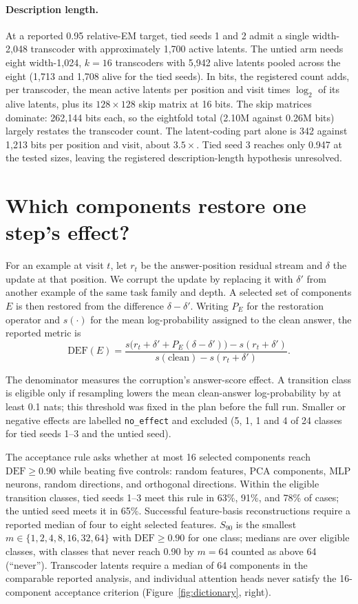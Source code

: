 \documentclass[10pt,letterpaper]{article}
\newcommand{\DEF}{\mathrm{DEF}}
\begin{document}
\paragraph{Description length.} At a reported 0.95 relative-EM target, tied seeds 1 and 2 admit a single width-2,048 transcoder with approximately 1,700 active latents. The untied arm needs eight width-1{,}024, $k{=}16$ transcoders with 5{,}942 alive latents pooled across the eight (1{,}713 and 1{,}708 alive for the tied seeds). In bits, the registered count adds, per transcoder, the mean active latents per position and visit times $\log_2$ of its alive latents, plus its $128\times128$ skip matrix at 16 bits. The skip matrices dominate: 262{,}144 bits each, so the eightfold total (2.10M against 0.26M bits) largely restates the transcoder count. The latent-coding part alone is 342 against 1{,}213 bits per position and visit, about $3.5\times$. Tied seed 3 reaches only 0.947 at the tested sizes, leaving the registered description-length hypothesis unresolved.

\section{Which components restore one step's effect?}\label{sec:mediation}
For an example at visit $t$, let $r_t$ be the answer-position residual stream and $\delta$ the update at that position. We corrupt the update by replacing it with $\delta'$ from another example of the same task family and depth. A selected set of components $E$ is then restored from the difference $\delta-\delta'$. Writing $P_E$ for the restoration operator and $s(\cdot)$ for the mean log-probability assigned to the clean answer, the reported metric is
\begin{equation}
\DEF(E)=\frac{s\bigl(r_t+\delta'+P_E(\delta-\delta')\bigr)-s(r_t+\delta')}{s(\mathrm{clean})-s(r_t+\delta')}.
\label{eq:def}
\end{equation}

The denominator measures the corruption's answer-score effect. A transition class is eligible only if resampling lowers the mean clean-answer log-probability by at least 0.1 nats; this threshold was fixed in the plan before the full run. Smaller or negative effects are labelled \texttt{no\_effect} and excluded (5, 1, 1 and 4 of 24 classes for tied seeds 1--3 and the untied seed).

The acceptance rule asks whether at most 16 selected components reach $\DEF\geq0.90$ while beating five controls: random features, PCA components, MLP neurons, random directions, and orthogonal directions. Within the eligible transition classes, tied seeds 1--3 meet this rule in 63\%, 91\%, and 78\% of cases; the untied seed meets it in 65\%. Successful feature-basis reconstructions require a reported median of four to eight selected features. $S_{90}$ is the smallest $m\in\{1,2,4,8,16,32,64\}$ with $\DEF\geq0.90$ for one class; medians are over eligible classes, with classes that never reach 0.90 by $m=64$ counted as above 64 (``never''). Transcoder latents require a median of 64 components in the comparable reported analysis, and individual attention heads never satisfy the 16-component acceptance criterion (Figure~\ref{fig:dictionary}, right).
\end{document}
